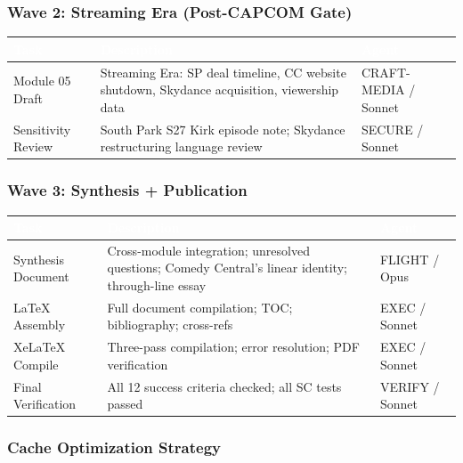 \documentclass[11pt,letterpaper]{article}
\newcommand{\tableheader}[1]{\textbf{\sffamily\textcolor{white}{#1}}}
\begin{document}
\subsubsection{Wave 2: Streaming Era (Post-CAPCOM Gate)}

\begin{center}
\begin{tabularx}{\textwidth}{L{3.5cm}XC{2cm}}
\toprule
{}
\tableheader{Task} & \tableheader{Description} & \tableheader{Agent} \\
\midrule
Module 05 Draft & Streaming Era: SP deal timeline, CC website shutdown, Skydance acquisition, viewership data & CRAFT-MEDIA / Sonnet \\
Sensitivity Review & South Park S27 Kirk episode note; Skydance restructuring language review & SECURE / Sonnet \\
\bottomrule
\end{tabularx}
\end{center}

\subsubsection{Wave 3: Synthesis + Publication}

\begin{center}
\begin{tabularx}{\textwidth}{L{3.5cm}XC{2cm}}
\toprule
{}
\tableheader{Task} & \tableheader{Description} & \tableheader{Agent} \\
\midrule
Synthesis Document & Cross-module integration; unresolved questions; Comedy Central's linear identity; through-line essay & FLIGHT / Opus \\
LaTeX Assembly & Full document compilation; TOC; bibliography; cross-refs & EXEC / Sonnet \\
XeLaTeX Compile & Three-pass compilation; error resolution; PDF verification & EXEC / Sonnet \\
Final Verification & All 12 success criteria checked; all SC tests passed & VERIFY / Sonnet \\
\bottomrule
\end{tabularx}
\end{center}

\subsubsection{Cache Optimization Strategy}
\end{document}
